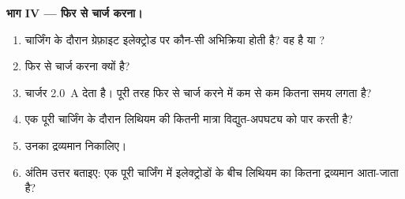 \begin{problem}
\medskip
\noindent\textbf{भाग IV --- फिर से चार्ज करना।}
\begin{enumerate}[resume]
  \item चार्जिंग के दौरान ग्रेफ़ाइट इलेक्ट्रोड पर कौन-सी अभिक्रिया
        होती है? वह  है या ?
  \item फिर से चार्ज करना  क्यों है?
  \item चार्जर \qty{2.0}{A} देता है। पूरी तरह फिर से चार्ज करने में कम से कम
        कितना समय लगता है?
  \item एक पूरी चार्जिंग के दौरान लिथियम  की कितनी मात्रा विद्युत-अपघट्य
        को पार करती है?
  \item उनका द्रव्यमान निकालिए।
  \item अंतिम उत्तर बताइए: एक पूरी चार्जिंग में इलेक्ट्रोडों के बीच लिथियम का कितना
        द्रव्यमान आता-जाता है?
\end{enumerate}
\end{problem}
